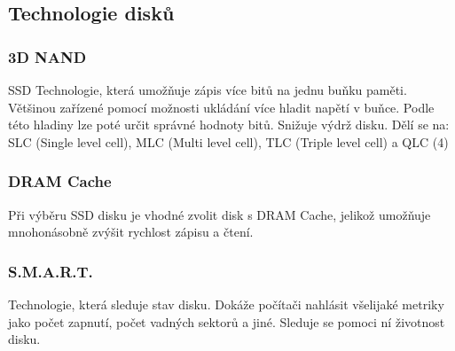 \subsection{Technologie disků}
\subsubsection{3D NAND}
SSD Technologie, která umožňuje zápis více bitů na jednu buňku paměti.
Většinou zařízené pomocí možnosti ukládání více hladit napětí v buňce.
Podle této hladiny lze poté určit správné hodnoty bitů.
Snižuje výdrž disku.
Dělí se na: SLC (Single level cell), MLC (Multi level cell), TLC (Triple level cell) a QLC (4)
\subsubsection{DRAM Cache}
Při výběru SSD disku je vhodné zvolit disk s DRAM Cache, jelikož umožňuje mnohonásobně zvýšit rychlost zápisu a čtení.
\subsubsection{S.M.A.R.T.}
Technologie, která sleduje stav disku.
Dokáže počítači nahlásit všelijaké metriky jako počet zapnutí, počet vadných sektorů a jiné.
Sleduje se pomoci ní životnost disku.
